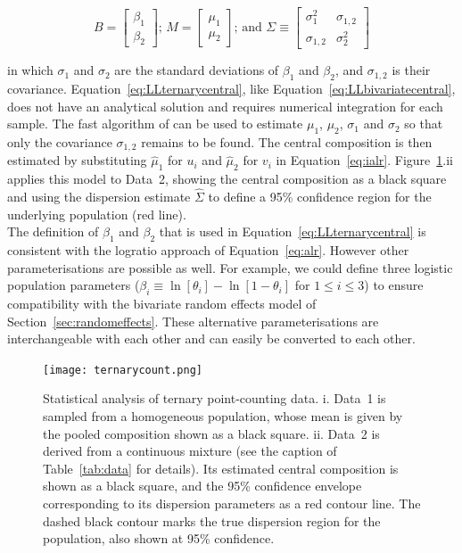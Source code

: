 \documentclass{article}
\begin{document}
\begin{equation*}
  B =
  \left[
    \begin{array}{c}
      \beta_1 \\
      \beta_2
    \end{array}
    \right]
  \mbox{;~}
  M =
  \left[
    \begin{array}{c}
      \mu_1 \\
      \mu_2
    \end{array}
    \right]
  \mbox{;~and~}
  \Sigma \equiv
  \left[
    \begin{array}{cc}
      \sigma_1^2 & \sigma_{1,2} \\
      \sigma_{1,2} & \sigma_2^2
    \end{array}
    \right]
\end{equation*}

\noindent  in  which  $\sigma_1$   and  $\sigma_2$  are  the  standard
deviations  of $\beta_1$  and $\beta_2$,  and $\sigma_{1,2}$  is their
covariance.          Equation~\ref{eq:LLternarycentral},          like
Equation~\ref{eq:LLbivariatecentral},  does  not  have  an  analytical
solution and requires numerical integration for each sample.  The fast
algorithm of  \citet{galbraith1993} can  be used to  estimate $\mu_1$,
$\mu_2$,  $\sigma_1$  and  $\sigma_2$  so  that  only  the  covariance
$\sigma_{1,2}$ remains to  be found.  The central  composition is then
estimated by  substituting $\hat{\mu}_1$  for $u_i$  and $\hat{\mu}_2$
for $v_i$ in Equation~\ref{eq:ialr}. Figure~\ref{fig:ternarycounts}.ii
applies this  model to  Data~2, showing the  central composition  as a
black  square  and using  the  dispersion  estimate $\hat{\Sigma}$  to
define a  95\% confidence  region for  the underlying  population (red
line).\\

The definition of $\beta_1$ and $\beta_2$ that is used in
Equation~\ref{eq:LLternarycentral} is consistent with the logratio
approach of Equation~\ref{eq:alr}. However other parameterisations are
possible as well. For example, we could define three logistic
population parameters ($\beta_i \equiv \ln[\theta_i] -
\ln[1-\theta_i]$ for $1 \leq i \leq 3$) to ensure compatibility with
the bivariate random effects model of Section~\ref{sec:randomeffects}.
These alternative parameterisations are interchangeable with each
other and can easily be converted to each other.

\begin{figure}[!ht]
  \centering
  \texttt{[image: ternarycount.png]}
  \caption{Statistical analysis of ternary point-counting
    data. i. Data~1 is sampled from a homogeneous population, whose
    mean is given by the pooled composition shown as a black
    square. ii. Data~2 is derived from a continuous mixture (see the
    caption of Table~\ref{tab:data} for details). Its estimated
    central composition is shown as a black square, and the 95\%
    confidence envelope corresponding to its dispersion parameters as
    a red contour line. The dashed black contour marks the true
    dispersion region for the population, also shown at 95\%
    confidence.}
  \label{fig:ternarycounts}
\end{figure}
\end{document}
